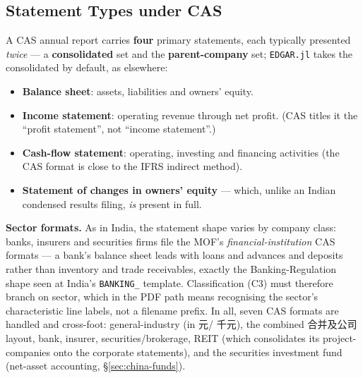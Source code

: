 \documentclass[11pt,a4paper]{report}
\newcommand{\cncjk}[2]{{\cjkCNfont #1}}
\begin{document}
\subsection{Statement Types under CAS}\label{sec:china-statements}
A CAS annual report carries \textbf{four} primary statements, each typically presented \emph{twice} --- a
\textbf{consolidated} set and the \textbf{parent-company} set; \texttt{EDGAR.jl} takes the consolidated by
default, as elsewhere:

\begin{itemize}
  \item \textbf{Balance sheet}: assets, liabilities and owners' equity.
  \item \textbf{Income statement}: operating revenue through net profit. (CAS titles it the ``profit
    statement'', not ``income statement''.)
  \item \textbf{Cash-flow statement}: operating, investing and financing activities (the CAS format is close
    to the IFRS indirect method).
  \item \textbf{Statement of changes in owners' equity} --- which, unlike an Indian condensed results
    filing, \emph{is} present in full.
\end{itemize}

\noindent \textbf{Sector formats.} As in India, the statement shape varies by company class: banks, insurers
and securities firms file the MOF's \emph{financial-institution} CAS formats --- a bank's balance sheet leads
with loans and advances and deposits rather than inventory and trade receivables, exactly the
Banking-Regulation shape seen at India's \texttt{BANKING\_} template. Classification (C3) must therefore
branch on sector, which in the PDF path means recognising the sector's characteristic line labels, not a
filename prefix. In all, seven CAS formats are handled and cross-foot: general-industry (in \cncjk{元}{}/
\cncjk{千元}{}), the combined \cncjk{合并及公司}{} layout, bank, insurer, securities/brokerage, REIT (which
consolidates its project-companies onto the corporate statements), and the securities investment fund
(net-asset accounting, \S\ref{sec:china-funds}).
\end{document}
